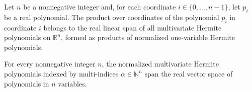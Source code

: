 \begin{lemma}
\label{BooleanAnalysis.GaussianSpace.coordinatePolynomialProduct_mem_span_hermite}
\leanok
{}
Let $n$ be a nonnegative integer and, for each coordinate $i\in\{0,\ldots,n-1\}$, let
$p_i$ be a real polynomial. The product over coordinates of the polynomial $p_i$ in
coordinate $i$ belongs to the real linear span of all multivariate Hermite polynomials
on $\mathbb R^n$, formed as products of normalized one-variable Hermite polynomials.
\end{lemma}

\begin{theorem}
\label{BooleanAnalysis.GaussianSpace.span_multivariateHermitePolynomial_eq_top}
\leanok
{}
For every nonnegative integer $n$, the normalized multivariate Hermite polynomials
indexed by multi-indices $\alpha\in\mathbb N^n$ span the real vector space of
polynomials in $n$ variables.
\end{theorem}

